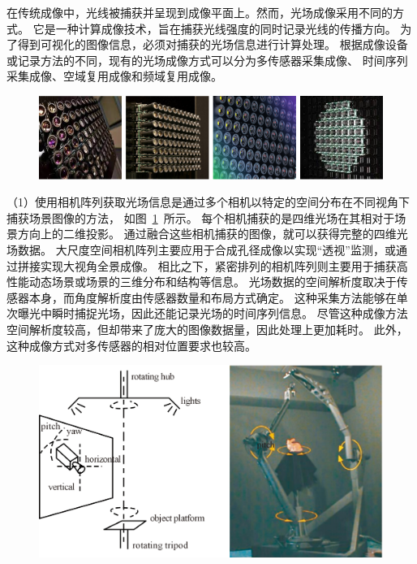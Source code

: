 在传统成像中，光线被捕获并呈现到成像平面上。然而，光场成像采用不同的方式。
它是一种计算成像技术，旨在捕获光线强度的同时记录光线的传播方向。
为了得到可视化的图像信息，必须对捕获的光场信息进行计算处理。
根据成像设备或记录方法的不同，现有的光场成像方式可以分为多传感器采集成像、
时间序列采集成像、空域复用成像和频域复用成像。\par
\begin{figure}[!ht]
	\centering
	\includegraphics[width=1\linewidth]{figures/chapter2/camera_array}
	\label{chapter2_fig2:camera_array}
\end{figure}
（1）使用相机阵列获取光场信息是通过多个相机以特定的空间分布在不同视角下捕获场景图像的方法，
如图~\ref{chapter2_fig2:camera_array}~所示。
每个相机捕获的是四维光场在其相对于场景方向上的二维投影。
通过融合这些相机捕获的图像，就可以获得完整的四维光场数据。
大尺度空间相机阵列主要应用于合成孔径成像以实现“透视”监测，或通过拼接实现大视角全景成像。
相比之下，紧密排列的相机阵列则主要用于捕获高性能动态场景或场景的三维分布和结构等信息。
光场数据的空间解析度取决于传感器本身，而角度解析度由传感器数量和布局方式确定。
这种采集方法能够在单次曝光中瞬时捕捉光场，因此还能记录光场的时间序列信息。
尽管这种成像方法空间解析度较高，但却带来了庞大的图像数据量，因此处理上更加耗时。
此外，这种成像方式对多传感器的相对位置要求也较高。\par
%
%
%
%
\begin{figure}[!ht]
	\centering
	\includegraphics[width=0.7\linewidth]{figures/chapter2/time_seq2}
	\label{chapter2_fig3:time_seq2}
\end{figure}
